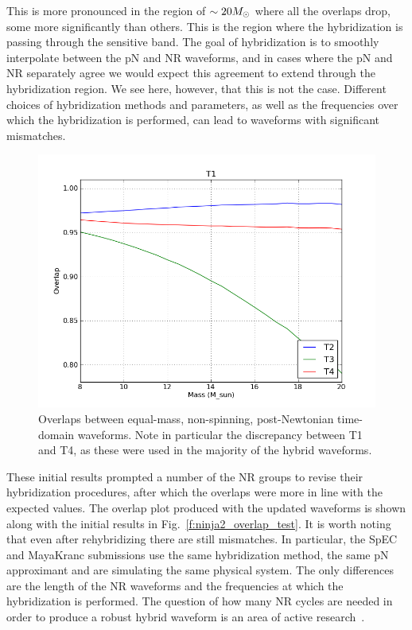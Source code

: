 This is more pronounced in the region of $\sim 20 M_\odot$ where all
the overlaps drop, some more significantly than others.  This is the
region where the hybridization is passing through the sensitive band.
The goal of hybridization is to smoothly interpolate between the pN
and NR waveforms, and in cases where the pN and NR separately agree we
would expect this agreement to extend through the hybridization
region.  We see here, however, that this is not the case.  Different
choices of hybridization methods and parameters, as well as the
frequencies over which the hybridization is performed, can lead to
waveforms with significant mismatches.  

\begin{figure}
  \includegraphics[width=\linewidth]{figures/ninja2/pn_figure03}
  \caption[Overlaps between pN waveforms as a function of mass]{
  \label{f:pn_overlaps}
Overlaps between equal-mass, non-spinning, post-Newtonian time-domain 
waveforms.  Note in particular the discrepancy between T1 and T4, as
these were used in the majority of the hybrid waveforms.
}
\end{figure}%


These initial results prompted a number of the NR groups to revise
their hybridization procedures, after which the overlaps were more in
line with the expected values.  The overlap plot produced with the
updated waveforms is shown along with the initial results in
Fig.~\ref{f:ninja2_overlap_test}.  It is worth noting that even
after rehybridizing there are still mismatches.  In particular, the
SpEC and MayaKranc submissions use the same hybridization method, the
same pN approximant and are simulating the same physical system.  The
only differences are the length of the NR waveforms and the
frequencies at which the hybridization is performed.  The question of
how many NR cycles are needed in order to produce a robust hybrid
waveform is an area of active research~\cite{MacDonald:2011}. 

